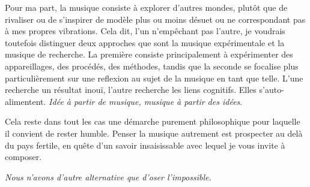 \documentclass{article}
\begin{document}
Pour ma part, la musique consiste à explorer d'autres mondes, plutôt que de rivaliser ou de s'inspirer de modèle plus ou moins désuet ou ne correspondant pas à mes propres vibrations. Cela dit, l'un n'empêchant pas l'autre, je voudrais toutefois distinguer deux approches que sont la musique expérimentale et la musique de recherche. La première consiste principalement à expérimenter des appareillages, des procédés, des méthodes, tandis que la seconde se focalise plus particulièrement sur une reflexion au sujet de la musique en tant que telle. L'une recherche un résultat inouï, l'autre recherche les liens cognitifs. Elles s'auto-alimentent. \textit{Idée à partir de musique, musique à partir des idées}.

Cela reste dans tout les cas une démarche purement philosophique pour laquelle il convient de rester humble. Penser la musique autrement est prospecter au delà du pays fertile, en quête d’un savoir insaisissable avec lequel je vous invite à composer. 

\bigskip

\textit{Nous n’avons d’autre alternative que d’oser l’impossible.}
\end{document}
